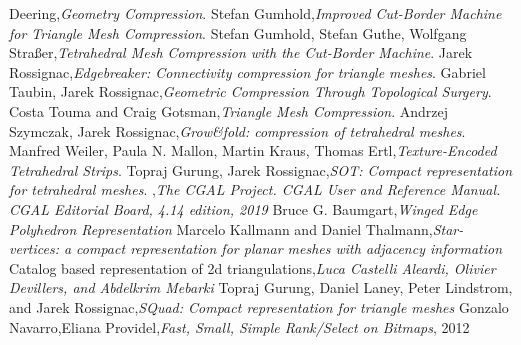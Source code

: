 \documentclass[a4paper,11pt,openany]{article}
\begin{document}
\begin{thebibliography}{999}
Deering,\emph{Geometry Compression}. 
Stefan Gumhold,\emph{Improved Cut-Border Machine for Triangle Mesh Compression}. 
Stefan Gumhold, Stefan Guthe, Wolfgang Straßer,\emph{Tetrahedral Mesh Compression with the Cut-Border Machine}. 
Jarek Rossignac,\emph{Edgebreaker: Connectivity compression for triangle meshes}. 
Gabriel Taubin, Jarek Rossignac,\emph{Geometric Compression Through Topological Surgery}. 
Costa Touma and Craig Gotsman,\emph{Triangle Mesh Compression}. 
Andrzej Szymczak, Jarek Rossignac,\emph{Grow\&fold: compression of tetrahedral meshes}. 
Manfred Weiler, Paula N. Mallon, Martin Kraus, Thomas Ertl,\emph{Texture-Encoded Tetrahedral Strips}. 
Topraj Gurung, Jarek Rossignac,\emph{SOT: Compact representation for tetrahedral meshes}. 
,\emph{The CGAL Project. CGAL User and Reference Manual. CGAL Editorial Board, 4.14 edition, 2019}
Bruce G. Baumgart,\emph{Winged Edge Polyhedron Representation}
Marcelo Kallmann and Daniel Thalmann,\emph{Star-vertices: a compact representation for planar meshes with adjacency information}
Catalog based representation of 2d triangulations,\emph{Luca Castelli Aleardi, Olivier Devillers, and Abdelkrim Mebarki}
Topraj Gurung, Daniel Laney, Peter Lindstrom, and Jarek Rossignac,\emph{SQuad: Compact representation for triangle meshes}
Gonzalo Navarro,Eliana Providel,\emph{Fast, Small, Simple Rank/Select on Bitmaps}, 2012
\end{thebibliography}
\end{document}
